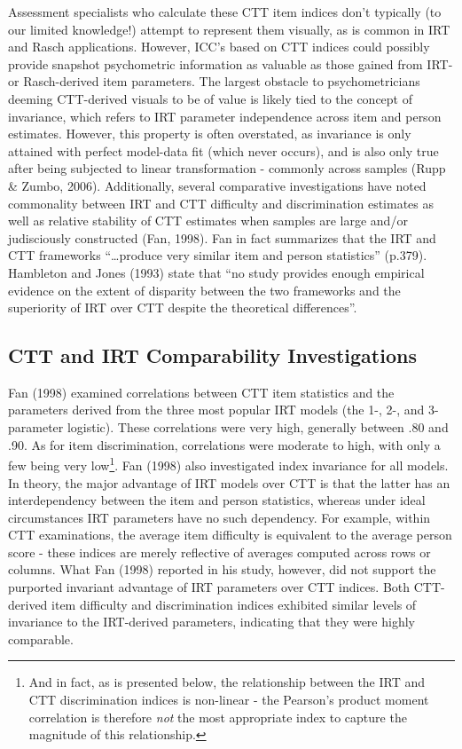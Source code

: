 \documentclass[
  man]{apa6}
\begin{document}
Assessment specialists who calculate these CTT item indices don't typically (to our limited knowledge!) attempt to represent them visually, as is common in IRT and Rasch applications. However, ICC's based on CTT indices could possibly provide snapshot psychometric information as valuable as those gained from IRT- or Rasch-derived item parameters. The largest obstacle to psychometricians deeming CTT-derived visuals to be of value is likely tied to the concept of invariance, which refers to IRT parameter independence across item and person estimates. However, this property is often overstated, as invariance is only attained with perfect model-data fit (which never occurs), and is also only true after being subjected to linear transformation - commonly across samples (Rupp \& Zumbo, 2006). Additionally, several comparative investigations have noted commonality between IRT and CTT difficulty and discrimination estimates as well as relative stability of CTT estimates when samples are large and/or judisciously constructed (Fan, 1998). Fan in fact summarizes that the IRT and CTT frameworks ``\ldots produce very similar item and person statistics'' (p.379). Hambleton and Jones (1993) state that ``no study provides enough empirical evidence on the extent of disparity between the two frameworks and the superiority of IRT over CTT despite the theoretical differences''.

\hypertarget{ctt-and-irt-comparability-investigations}{%
\subsection{CTT and IRT Comparability Investigations}\label{ctt-and-irt-comparability-investigations}}

Fan (1998) examined correlations between CTT item statistics and the parameters derived from the three most popular IRT models (the 1-, 2-, and 3-parameter logistic). These correlations were very high, generally between .80 and .90. As for item discrimination, correlations were moderate to high, with only a few being very low\footnote{And in fact, as is presented below, the relationship between the IRT and CTT discrimination indices is non-linear - the Pearson's product moment correlation is therefore \emph{not} the most appropriate index to capture the magnitude of this relationship.}. Fan (1998) also investigated index invariance for all models. In theory, the major advantage of IRT models over CTT is that the latter has an interdependency between the item and person statistics, whereas under ideal circumstances IRT parameters have no such dependency. For example, within CTT examinations, the average item difficulty is equivalent to the average person score - these indices are merely reflective of averages computed across rows or columns. What Fan (1998) reported in his study, however, did not support the purported invariant advantage of IRT parameters over CTT indices. Both CTT-derived item difficulty and discrimination indices exhibited similar levels of invariance to the IRT-derived parameters, indicating that they were highly comparable.
\end{document}
